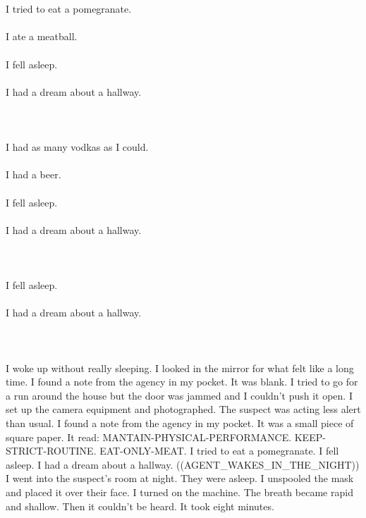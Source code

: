 \documentclass{article}
\begin{document}
    \section{}
    I tried to eat a pomegranate.\\\\I ate a meatball.\\\\I fell asleep.\\\\I had a dream about a hallway.\\\\ 
    \newpage
    
    \section{}
    I had as many vodkas as I could.\\\\I had a beer.\\\\I fell asleep.\\\\I had a dream about a hallway.\\\\ 
    \newpage
    
    \section{}
    I fell asleep.\\\\I had a dream about a hallway.\\\\ 
    \newpage
    
    \section{}
    I woke up without really sleeping. I looked in the mirror for what felt like a long time. I found a note from the agency in my pocket. It was blank. I tried to go for a run around the house but the door was jammed and I couldn't push it open. I set up the camera equipment and photographed. The suspect was acting less alert than usual. I found a note from the agency in my pocket. It was a small piece of square paper. It read: MANTAIN-PHYSICAL-PERFORMANCE. KEEP-STRICT-ROUTINE. EAT-ONLY-MEAT. I tried to eat a pomegranate. I fell asleep. I had a dream about a hallway. ((AGENT_WAKES_IN_THE_NIGHT)) I went into the suspect's room at night. They were asleep. I unspooled the mask and placed it over their face. I turned on the machine. The breath became rapid and shallow. Then it couldn't be heard. It took eight minutes. \\\\
    \newpage
    
\end{document}
